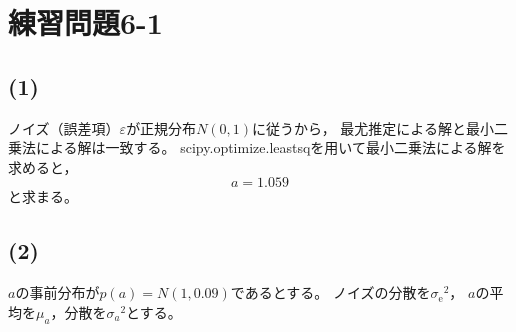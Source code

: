 \documentclass[class=jsarticle, crop=false, dvipdfmx, fleqn]{standalone}
\begin{document}
\section*{練習問題6-1}

\subsection*{(1)}
ノイズ（誤差項）$\varepsilon$が正規分布$N(0, 1)$に従うから，
最尤推定による解と最小二乗法による解は一致する。
scipy.optimize.leastsqを用いて最小二乗法による解を求めると，
\begin{equation}
a = 1.059
\end{equation}
と求まる。


\subsection*{(2)}
$a$の事前分布が$p(a) = N(1, 0.09)$であるとする。
ノイズの分散を${\sigma_\mathrm{e}}^2$，
$a$の平均を$\mu_a$，分散を${\sigma_a}^2$とする。
\end{document}
